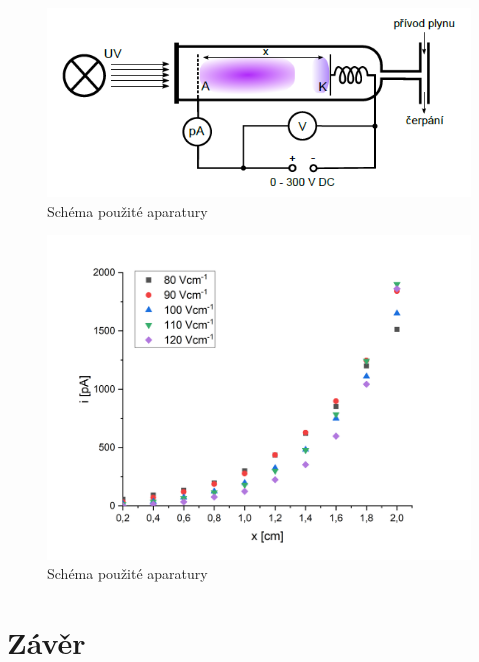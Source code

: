\documentclass[a4paper,12pt]{article}
\begin{document}
\begin{figure}[h]
	\centering
	\includegraphics[width=130mm]{aparatura.png}
	\caption{Schéma použité aparatury}
	\label{aparatura}
\end{figure}

\begin{figure}[h]
	\centering
	\includegraphics[width=130mm]{i=f(x).png}
	\caption{Schéma použité aparatury}
	\label{ifx}
\end{figure}


\section{Závěr}
\end{document}
